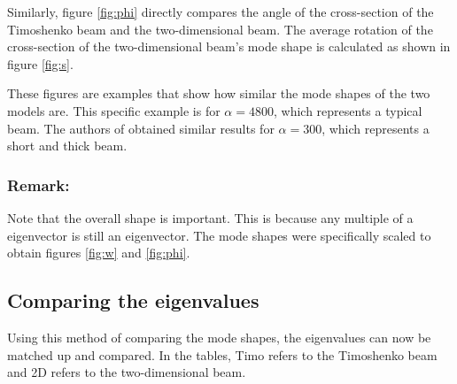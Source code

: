 \documentclass[../../main.tex]{subfiles}
\begin{document}
Similarly, figure \ref{fig:phi} directly compares the angle of the cross-section of the Timoshenko beam and the two-dimensional beam. The average rotation of the cross-section of the two-dimensional beam's mode shape is calculated as shown in figure \ref{fig:s}.

\FloatBarrier
\begin{figure}[ht!]
\end{figure}
\FloatBarrier

These figures are examples that show how similar the mode shapes of the two models are. This specific example is for $\alpha = 4800$, which represents a typical beam. The authors of \cite{LVV09} obtained similar results for $\alpha=300$, which represents a short and thick beam.

\subsubsection{Remark:} Note that the overall shape is important. This is because any multiple of a eigenvector is still an eigenvector. The mode shapes were specifically scaled to obtain figures \ref{fig:w} and \ref{fig:phi}.

\subsection{Comparing the eigenvalues}
Using this method of comparing the mode shapes, the eigenvalues can now be matched up and compared. In the tables, Timo refers to the Timoshenko beam and 2D refers to the two-dimensional beam.
\end{document}

